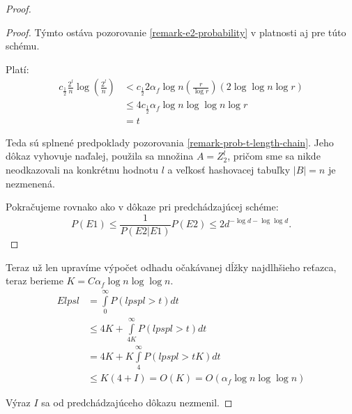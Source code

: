 \begin{proof}
\begin{proof}
Týmto ostáva pozorovanie \ref{remark-e2-probability} v platnosti aj pre túto schému.

Platí:
\begin{displaymath}
\begin{split}
c_{\frac{1}{2}} \frac{2^l}{n} \log \left(\frac{2^l}{n}\right) 
	& < c_{\frac{1}{2}} 2 \alpha_f \log n \left( \frac{r}{\log r} \right) \left(2 \log \log n \log r \right) \\
	& \leq 4 c_{\frac{1}{2}} \alpha_f \log n \log \log n \log r \\
	& = t
\end{split}
\end{displaymath}

Teda sú splnené predpoklady pozorovania \ref{remark-prob-t-length-chain}. Jeho dôkaz vyhovuje naďalej, použila sa množina $A = Z_2^l$, pričom sme sa nikde neodkazovali na konkrétnu hodnotu $l$ a veľkosť hashovacej tabuľky $|B| = n$ je nezmenená.

Pokračujeme rovnako ako v dôkaze pri predchádzajúcej schéme:
\begin{displaymath}
P(E1) \leq \frac{1}{P(E2|E1)}P(E2) \leq 2 d ^ {-\log d - \log \log d}\textit{.}
\end{displaymath}
\end{proof}

Teraz už len upravíme výpočet odhadu očakávanej dĺžky najdlhšieho reťazca, teraz berieme $K = C \alpha_f \log n \log \log n$.
\begin{displaymath}
\begin{split}
E lpsl 
	& = \int\limits_0^\infty P(lpspl > t) dt \\
	& \leq 4K + \int\limits_{4K}^\infty P(lpspl > t) dt \\
	& = 4K + K\int\limits_4^\infty P(lpspl > tK) dt \\
	& \leq K(4 + I) = O(K) = O(\alpha_f \log n \log \log n)
\end{split}
\end{displaymath}

Výraz $I$ sa od predchádzajúceho dôkazu nezmenil.
\end{proof}